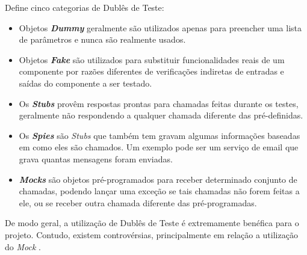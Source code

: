  Define cinco categorias de Dublês de Teste:

\begin{itemize}
\item
Objetos \textbf{\textit{Dummy}} geralmente são utilizados apenas para preencher uma lista de parâmetros e nunca são realmente usados.

\item
Objetos \textbf{\textit{Fake}} são utilizados para substituir funcionalidades reais de um componente por razões diferentes de verificações indiretas de entradas e saídas do componente a ser   testado.

\item
Os \textbf{\textit{Stubs}} provêm respostas prontas para chamadas feitas durante os testes, geralmente não respondendo a qualquer   chamada diferente
das pré-definidas.

\item
Os \textbf{\textit{Spies}} são \textit{Stubs} que também tem gravam algumas informações baseadas em como eles são chamados. Um exemplo   pode ser um serviço de email que grava quantas mensagens foram   enviadas.

\item
\textbf{\textit{Mocks}} são objetos pré-programados para receber determinado conjunto de chamadas, podendo lançar uma exceção se tais chamadas não forem feitas a ele, ou se receber outra chamada diferente das pré-programadas.
\end{itemize}

De modo geral, a utilização de Dublês de Teste é extremamente benéfica para o projeto. Contudo, existem controvérsias, principalmente em relação a utilização do \textit{Mock} \cite{MocksArentStubs}.